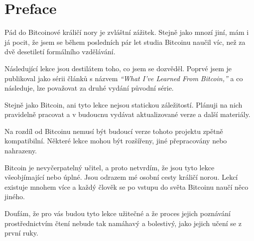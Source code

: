 \chapter*{Preface}

Pád do Bitcoinové králičí nory je zvláštní zážitek. Stejně jako mnozí jiní, 
mám i já pocit, že jsem se během posledních pár let studia Bitcoinu naučil víc, 
než za dvě desetiletí formálního vzdělávání.

Následující lekce jsou destilátem toho, co jsem se dozvěděl. Poprvé jsem je publikoval 
jako sérii článků s názvem \textit{“What I’ve Learned From Bitcoin,”} a co následuje, 
lze považovat za druhé vydání původní série.

Stejně jako Bitcoin, ani tyto lekce nejsou statickou záležitostí. Plánuji na nich 
pravidelně pracovat a v budoucnu vydávat aktualizované verze a další materiály.

Na rozdíl od Bitcoinu nemusí být budoucí verze tohoto projektu zpětně kompatibilní. 
Některé lekce mohou být rozšířeny, jiné přepracovány nebo nahrazeny.

Bitcoin je nevyčerpatelný učitel, a proto netvrdím, že jsou tyto lekce všeobjímající 
nebo úplné. Jsou odrazem mé osobní cesty králičí norou. Lekcí existuje mnohem 
více a každý člověk se po vstupu do světa Bitcoinu naučí něco jiného.

Doufám, že pro vás budou tyto lekce užitečné a že proces jejich poznávání 
prostřednictvím čtení nebude tak namáhavý a bolestivý, jako jejich učení se z první ruky.

%
%
